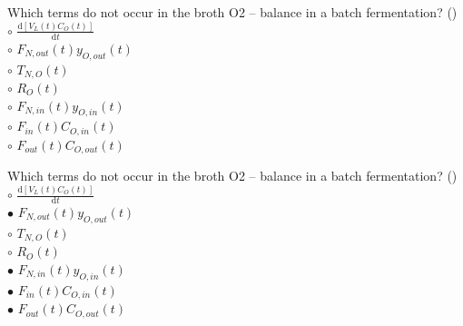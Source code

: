 \documentclass[]{beamer}
\begin{document}
\begin{frame}[shrink] {}
\addtocounter{questions}{1}
\color{blue}
Which terms do not occur in the broth O2 – balance in a batch fermentation? ()\\
\color{black}
\setlength{\parindent}{-0.4cm}
{\color{red}$\circ$} $\frac{\mathrm d [V_{L}(t)C_O(t)]}{\mathrm dt}$ \\[0.3em]
{\color{red}$\circ$} $F_{N,out}(t) y_{O,out}(t)$ \\
{\color{red}$\circ$} $T_{N,O} (t)$ \\
{\color{red}$\circ$} $R_O (t)$ \\
{\color{red}$\circ$} $F_{N,in}(t) y_{O,in}(t)$ \\
{\color{red}$\circ$} $F_{in}(t) C_{O,in}(t)$ \\
{\color{red}$\circ$} $F_{out}(t) C_{O,out}(t)$ \\
\end{frame}
\begin{frame}[shrink] {}
\addtocounter{answers}{1}
\color{blue}
Which terms do not occur in the broth O2 – balance in a batch fermentation? ()\\
\color{black}
\setlength{\parindent}{-0.4cm}
{\color{red}$\circ$} $\frac{\mathrm d [V_{L}(t)C_O(t)]}{\mathrm dt}$ \\[0.3em]
{\color{red}$\bullet$} $F_{N,out}(t) y_{O,out}(t)$ \\
{\color{red}$\circ$} $T_{N,O} (t)$ \\
{\color{red}$\circ$} $R_O (t)$ \\
{\color{red}$\bullet$} $F_{N,in}(t) y_{O,in}(t)$ \\
{\color{red}$\bullet$} $F_{in}(t) C_{O,in}(t)$ \\
{\color{red}$\bullet$} $F_{out}(t) C_{O,out}(t)$ \\
\end{frame}
\end{document}
